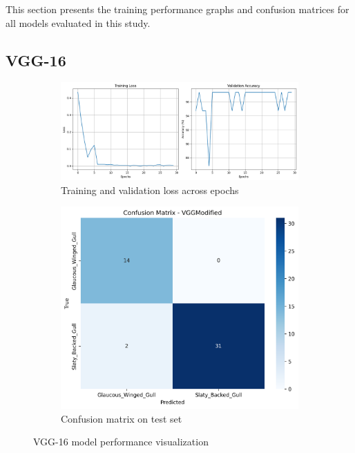 \documentclass[a4paper,12pt]{report}
\begin{document}
This section presents the training performance graphs and confusion matrices for all models evaluated in this study.

\subsection{VGG-16}
\begin{figure}[H]
    \centering
    \begin{subfigure}[b]{0.48\textwidth}
        \centering
        \includegraphics[width=\textwidth]{images/appendix/modelgraph/vgg/vgg.png}
        \caption{Training and validation loss across epochs}
        \label{fig:vgg_training}
    \end{subfigure}
    \hfill
    \begin{subfigure}[b]{0.48\textwidth}
        \centering
        \includegraphics[width=\textwidth]{images/appendix/modelgraph/vgg/vggmodified_confusion_matrix.png}
        \caption{Confusion matrix on test set}
        \label{fig:vgg_confusion}
    \end{subfigure}
    \caption{VGG-16 model performance visualization}
    \label{fig:vgg_performance}
\end{figure}
\end{document}
